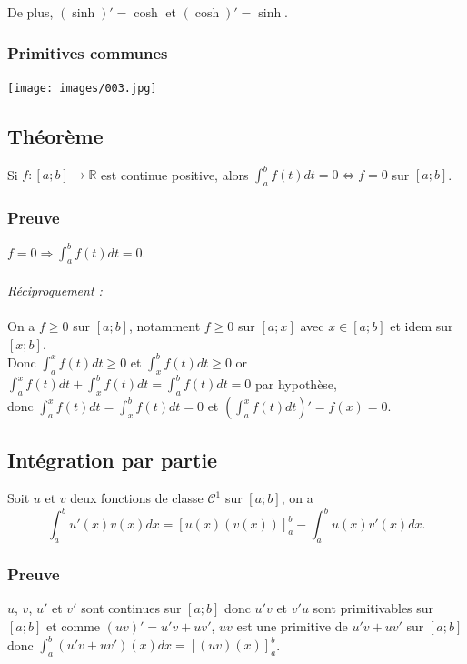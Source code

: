 \documentclass[a4paper,10pt]{book} %
\newcommand{\R}{\mathbb{R}}
\begin{document}
De plus, $(\sinh)'=\cosh$ et $(\cosh)'=\sinh$.

\subsubsection{Primitives communes}

\texttt{[image: images/003.jpg]}

\newpage

\subsection{Théorème}
Si $f:[a;b]\rightarrow \R$ est continue positive, alors $\displaystyle\int_{a}^{b} f(t)dt=0\Leftrightarrow f=0$ sur $[a;b]$.

\subsubsection{Preuve}
$f=0 \Rightarrow \displaystyle\int_{a}^{b}f(t)dt=0$.\\\\

\emph{Réciproquement :}\\\\
On a $f\geq 0$ sur $[a;b]$, notamment $f\geq 0$ sur $[a;x]$ avec $x\in [a;b]$ et idem sur $[x;b]$.\\

Donc $\displaystyle\int_{a}^{x}f(t)dt\geq 0$ et $\displaystyle\int_{x}^{b}f(t)dt\geq 0$ or $\displaystyle\int_{a}^{x}f(t)dt+\int_{x}^{b}f(t)dt=\int_{a}^{b}f(t)dt=0$ par hypothèse,\\
donc $\displaystyle\int_{a}^{x}f(t)dt=\int_{x}^{b}f(t)dt=0$ et $\displaystyle\left(\int_{a}^{x}f(t)dt\right)'=f(x)=0$.

\subsection{Intégration par partie}
Soit $u$ et $v$ deux fonctions de classe $\mathcal{C}^1$ sur $[a;b]$, on a $$\int_a^bu'(x)v(x)dx=[u(x)(v(x))]_a^b-\int_{a}^{b}u(x)v'(x)dx.$$

\subsubsection{Preuve}
$u$, $v$, $u'$ et $v'$ sont continues sur $[a;b]$
donc $u'v$ et $v'u$ sont primitivables sur $[a;b]$
et comme $(uv)'=u'v+uv'$, $uv$ est une primitive de $u'v+uv'$ sur $[a;b]$
donc $\displaystyle\int_a^b(u'v+uv')(x)dx=[(uv)(x)]_a^b$.
\end{document}
